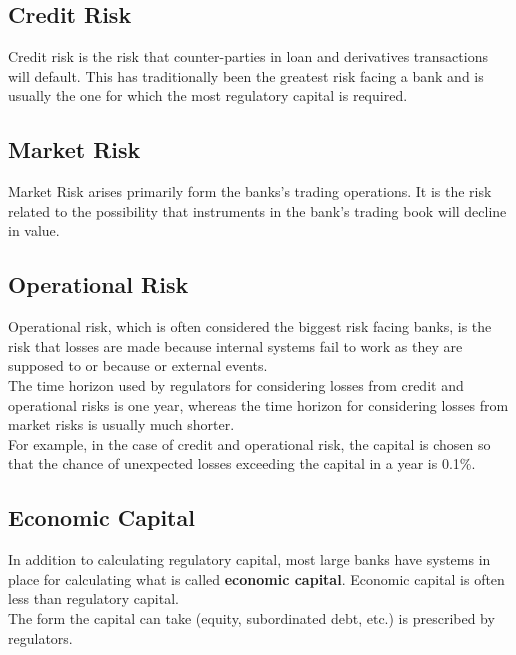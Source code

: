\subsection{Credit Risk}
Credit risk is the risk that counter-parties in loan and derivatives transactions will default. This has traditionally been the greatest risk facing a bank and is usually the one for which the most regulatory capital is required.

\subsection{Market Risk}
Market Risk arises primarily form the banks's trading operations. It is the risk related to the possibility that instruments in the bank's trading book will decline in value.

\subsection{Operational Risk}
Operational risk, which is often considered the biggest risk facing banks, is the risk that losses are made because internal systems fail to work as they are supposed to or because or external events.\\
The time horizon used by regulators for considering losses from credit and operational risks is one year, whereas the time horizon for considering losses from market risks is usually much shorter.\\
For example, in the case of credit and operational risk, the capital is chosen so that the chance of unexpected losses exceeding the capital in a year is 0.1\%.

\subsection{Economic Capital}
In addition to calculating regulatory capital, most large banks have systems in place for calculating what is called \textbf{\color{blue}economic capital}. Economic capital is often less than regulatory capital.\\
The form the capital can take (equity, subordinated debt, etc.) is prescribed by regulators.




